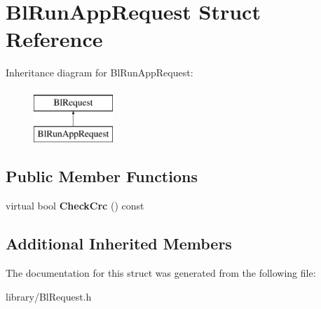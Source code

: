 \hypertarget{struct_bl_run_app_request}{\section{Bl\-Run\-App\-Request Struct Reference}
\label{struct_bl_run_app_request}
}
Inheritance diagram for Bl\-Run\-App\-Request\-:\begin{figure}[H]
\begin{center}
\leavevmode
\includegraphics[height=2.000000cm]{struct_bl_run_app_request}
\end{center}
\end{figure}
\subsection*{Public Member Functions}
\begin{DoxyCompactItemize}
\item 
\hypertarget{struct_bl_run_app_request_a63e276cbe52c1aa8a3c5ec3a16e6e21b}{virtual bool {\bfseries Check\-Crc} () const }\label{struct_bl_run_app_request_a63e276cbe52c1aa8a3c5ec3a16e6e21b}

\end{DoxyCompactItemize}
\subsection*{Additional Inherited Members}


The documentation for this struct was generated from the following file\-:\begin{DoxyCompactItemize}
\item 
library/Bl\-Request.\-h\end{DoxyCompactItemize}
